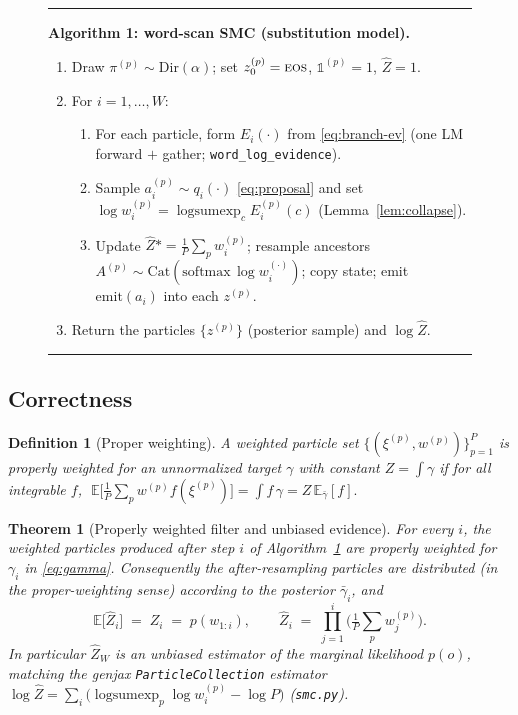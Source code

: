 \documentclass[11pt]{article}
\newcommand{\lse}{\operatorname{logsumexp}}
\newcommand{\Cat}{\mathrm{Cat}}
\newcommand{\Dir}{\mathrm{Dir}}
\newcommand{\eos}{\textsc{eos}}
\newcommand{\Ind}{\mathbb{1}}
\newcommand{\code}[1]{\texttt{#1}}
\newtheorem{theorem}{Theorem}
\newtheorem{definition}{Definition}
\begin{document}
\begin{figure}[t]
\hrule\vspace{2pt}
\textbf{Algorithm 1: word-scan SMC (substitution model).}
\begin{enumerate}[leftmargin=2em,itemsep=1pt]
  \item Draw $\pi^{(p)}\sim\Dir(\alpha)$; set $z^{(p)}_0=\eos$, $\Ind^{(p)}=1$, $\widehat Z = 1$.
  \item For $i = 1,\dots,W$:
  \begin{enumerate}[leftmargin=1.4em,itemsep=0pt]
    \item For each particle, form $E_i(\cdot)$ from \eqref{eq:branch-ev} (one LM forward $+$ gather;
          \code{word\_log\_evidence}).
    \item Sample $a_i^{(p)} \sim q_i(\cdot)$ \eqref{eq:proposal} and set
          $\log w_i^{(p)} = \lse_c E_i^{(p)}(c)$ (Lemma~\ref{lem:collapse}).
    \item Update $\widehat Z \mathrel{{*}{=}} \tfrac1P\sum_p w_i^{(p)}$; resample ancestors
          $A^{(p)}\sim\Cat(\mathrm{softmax}\,\log w_i^{(\cdot)})$; copy state; emit
          $\mathrm{emit}(a_i)$ into each $z^{(p)}$.
  \end{enumerate}
  \item Return the particles $\{z^{(p)}\}$ (posterior sample) and $\log\widehat Z$.
\end{enumerate}
\hrule
\label{alg:smc}
\end{figure}

\subsection{Correctness}

\begin{definition}[Proper weighting]
A weighted particle set $\{(\xi^{(p)}, w^{(p)})\}_{p=1}^P$ is \emph{properly weighted} for an
unnormalized target $\gamma$ with constant $Z=\int\gamma$ if for all integrable $f$,
$\;\mathbb{E}\!\big[\tfrac1P\sum_p w^{(p)} f(\xi^{(p)})\big] = \int f\,\gamma = Z\,\mathbb{E}_{\bar\gamma}[f].$
\end{definition}

\begin{theorem}[Properly weighted filter and unbiased evidence]\label{thm:smc}
For every $i$, the weighted particles produced after step $i$ of Algorithm~\ref{alg:smc} are properly
weighted for $\gamma_i$ in \eqref{eq:gamma}. Consequently the after-resampling particles are
distributed (in the proper-weighting sense) according to the posterior $\bar\gamma_i$, and
\begin{equation}
  \mathbb{E}\big[\widehat Z_i\big] \;=\; Z_i \;=\; p(w_{1:i}),
  \qquad
  \widehat Z_i \;=\; \prod_{j=1}^{i}\Big(\tfrac1P\textstyle\sum_p w_j^{(p)}\Big).
\end{equation}
In particular $\widehat Z_W$ is an unbiased estimator of the marginal likelihood $p(o)$, matching the
genjax \code{ParticleCollection} estimator $\log\widehat Z = \sum_i\big(\lse_p \log w_i^{(p)} - \log P\big)$
\textup{(\code{smc.py})}.
\end{theorem}
\end{document}
